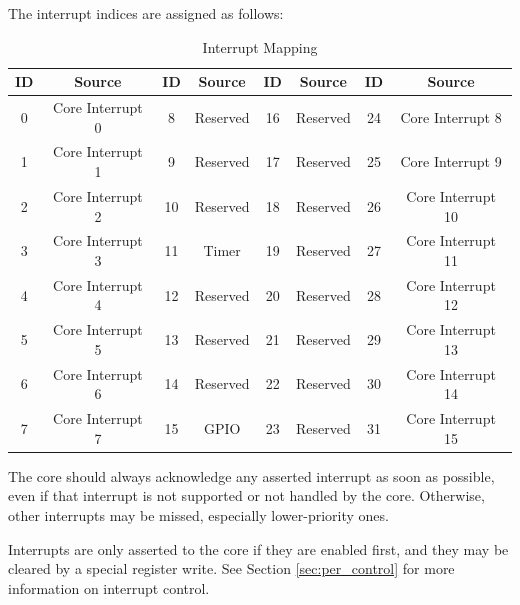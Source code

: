 The interrupt indices are assigned as follows:\\
\begin{table}[H]
    \centering
    \begin{tabular}{|c|c||c|c||c|c||c|c|}\hline
        ID & Source & ID & Source & ID & Source & ID & Source \\\hline\hline
        \cellcolor{blue!25}0 & \cellcolor{blue!25}Core Interrupt 0 & 8 & Reserved & 16 & Reserved & \cellcolor{blue!25}24 & \cellcolor{blue!25}Core Interrupt 8 \\
        \cellcolor{blue!25}1 & \cellcolor{blue!25}Core Interrupt 1 & 9 & Reserved & 17 & Reserved & \cellcolor{blue!25}25 & \cellcolor{blue!25}Core Interrupt 9 \\
        \cellcolor{blue!25}2 & \cellcolor{blue!25}Core Interrupt 2 & 10 & Reserved & 18 & Reserved & \cellcolor{blue!25}26 & \cellcolor{blue!25}Core Interrupt 10 \\
        \cellcolor{blue!25}3 & \cellcolor{blue!25}Core Interrupt 3 & \cellcolor{red!25}11 & \cellcolor{red!25}Timer & 19 & Reserved & \cellcolor{blue!25}27 & \cellcolor{blue!25}Core Interrupt 11 \\
        \cellcolor{blue!25}4 & \cellcolor{blue!25}Core Interrupt 4 & 12 & Reserved & 20 & Reserved & \cellcolor{blue!25}28 & \cellcolor{blue!25}Core Interrupt 12 \\
        \cellcolor{blue!25}5 & \cellcolor{blue!25}Core Interrupt 5 & 13 & Reserved & 21 & Reserved & \cellcolor{blue!25}29 & \cellcolor{blue!25}Core Interrupt 13 \\
        \cellcolor{blue!25}6 & \cellcolor{blue!25}Core Interrupt 6 & 14 & Reserved & 22 & Reserved & \cellcolor{blue!25}30 & \cellcolor{blue!25}Core Interrupt 14 \\
        \cellcolor{blue!25}7 & \cellcolor{blue!25}Core Interrupt 7 & \cellcolor{green!25}15 & \cellcolor{green!25}GPIO & 23 & Reserved & \cellcolor{blue!25}31 & \cellcolor{blue!25}Core Interrupt 15 \\\hline
    \end{tabular}
    \caption{Interrupt Mapping}
    \label{tab:interrupts}
\end{table}

The core should always acknowledge any asserted interrupt as soon as possible, even if that interrupt is not supported or not handled by the core. Otherwise, other interrupts may be missed, especially lower-priority ones.

Interrupts are only asserted to the core if they are enabled first, and they may be cleared by a special register write. See Section \ref{sec:per_control} for more information on interrupt control.

